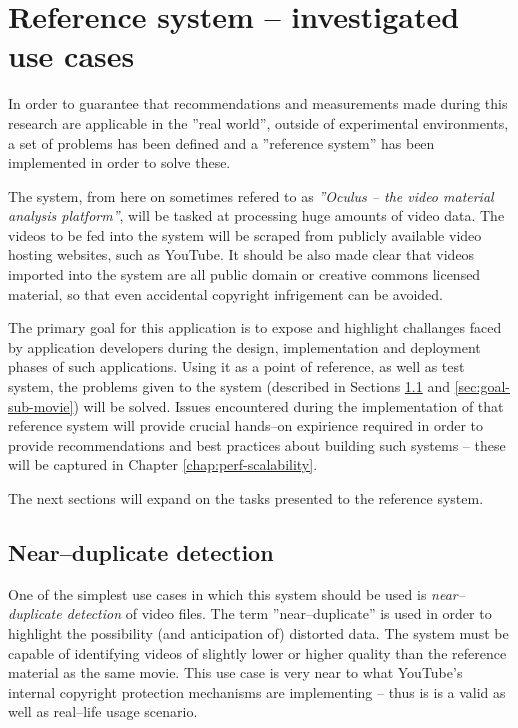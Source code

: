 \section{Reference system -- investigated use cases}
\label{sec:ref-system}

In order to guarantee that recommendations and measurements made during this research are applicable in the ''real world'', outside of experimental environments, a set of problems has been defined and a ''reference system'' has been implemented in order to solve these.

The system, from here on sometimes refered to as \textit{''Oculus -- the video material analysis platform''}, will be tasked at processing huge amounts of video data. The videos to be fed into the system will be scraped from publicly available video hosting websites, such as YouTube. It should be also made clear that videos imported into the system are all public domain or creative commons licensed material, so that even accidental copyright infrigement can be avoided.

The primary goal for this application is to expose and highlight challanges faced by application developers during the design, implementation and deployment phases of such applications. Using it as a point of reference, as well as test system, the problems given to the system (described in Sections \ref{sec:goal-near-dup} and \ref{sec:goal-sub-movie}) will be solved. Issues encountered during the implementation of that reference system will provide crucial hands--on expirience required in order to provide recommendations and best practices about building such systems -- these will be captured in Chapter \ref{chap:perf-scalability}.

The next sections will expand on the tasks presented to the reference system.


\subsection{Near--duplicate detection}
\label{sec:goal-near-dup}
One of the simplest use cases in which this system should be used is \textit{near--duplicate detection} of video files. The term ''near--duplicate'' is used in order to highlight the possibility (and anticipation of) distorted data. The system must be capable of identifying videos of slightly lower or higher quality than the reference material as the same movie. This use case is very near to what YouTube's \cite{youtube} internal copyright protection mechanisms are implementing -- thus is is a valid as well as real--life usage scenario.

